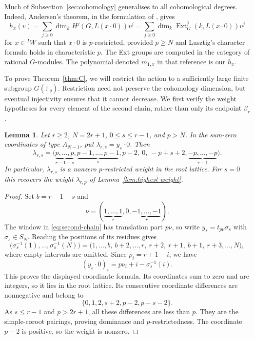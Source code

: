 \documentclass[11pt,a4paper,reqno]{amsart}
\numberwithin{equation}{section}
\newtheorem{lemma}[theorem]{Lemma}
\theoremstyle{definition}
\theoremstyle{remark}
\theoremstyle{plain}
\begin{document}
Much of Subsection~\ref{sec:cohomology} generalises to all
cohomological degrees. Indeed, Andersen's theorem, in the
formulation of \cite[Theorem~4.5]{Luebeck}, gives
\begin{equation}\label{eq:higher-rational-kl}
h_x(v)
=\sum_{j\geq0}\dim_k H^j(G,L(x\cdot0))v^j
=\sum_{j\geq0}\dim_k
\operatorname{Ext}^j_G(k,L(x\cdot0))v^j
\end{equation}
for $x\in{}^I W$ such that $x\cdot0$ is $p$-restricted, provided $p\geq N$ and Lusztig's character formula holds in characteristic $p$.
The Ext groups are computed in the category of rational
$G$-modules. The polynomial denoted $m_{1,x}$ in that
reference is our $h_x$.

To prove Theorem~\ref{thm:C}, we will restrict the action
to a sufficiently large finite subgroup $G(\mathbb F_q)$.
Restriction need not preserve the cohomology dimension,
but eventual injectivity ensures that it cannot decrease.
We first verify the weight hypotheses for every element
of the second chain, rather than only its endpoint $\beta_r$.

\begin{lemma}\label{lem:second-chain-weights}
Let $r\geq2$, $N=2r+1$, $0\leq s\leq r-1$, and $p>N$.
In the sum-zero coordinates of type $A_{N-1}$, put
$\lambda_{r,s}=y_s\cdot0$. Then
\[
\lambda_{r,s}=
\bigl(
\underbrace{p,\ldots,p}_{r-1-s},
\underbrace{p-1,\ldots,p-1}_{s},
p-2,\ 0,\ -p+s+2,
\underbrace{-p,\ldots,-p}_{r-1}
\bigr).
\]
In particular, $\lambda_{r,s}$ is a nonzero $p$-restricted weight in the root lattice.
For $s=0$ this recovers the weight $\lambda_{r,p}$ of
Lemma~\ref{lem:highest-weight}.
\end{lemma}

\begin{proof}
Set $b=r-1-s$ and
\[
\nu=(\underbrace{1,\ldots,1}_{r},0,
       \underbrace{-1,\ldots,-1}_{r}).
\]
The window in \eqref{eq:second-chain} has translation part
$p\nu$, so write $y_s=t_{p\nu}\sigma_s$ with $\sigma_s\in S_N$.
Reading the positions of its residues gives
\[
\bigl(\sigma_s^{-1}(1),\ldots,\sigma_s^{-1}(N)\bigr)
=\bigl(1,\ldots,b,\ b+2,\ldots,r,\ r+2,\ r+1,\ b+1,
        \ r+3,\ldots,N\bigr),
\]
where empty intervals are omitted.
Since $\rho_i=r+1-i$, we have
\[
(y_s\cdot0)_i=p\nu_i+i-\sigma_s^{-1}(i).
\]
This proves the displayed coordinate formula.
Its coordinates sum to zero and are integers, so it lies
in the root lattice. Its consecutive coordinate differences
are nonnegative and belong to
\[
\{0,1,2,s+2,p-2,p-s-2\}.
\]
As $s\leq r-1$ and $p>2r+1$, all these differences are
less than $p$. They are the simple-coroot pairings,
proving dominance and $p$-restrictedness.
The coordinate $p-2$ is positive, so the weight is nonzero.
\end{proof}
\end{document}
